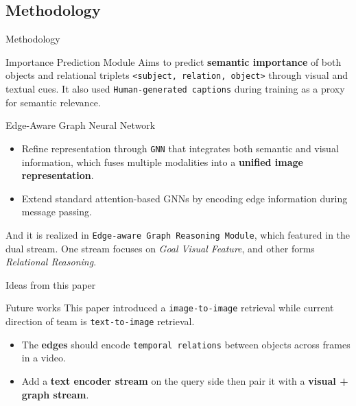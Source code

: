 \subsection{Methodology}
\begin{frame}{Methodology}
    \begin{block}{Importance Prediction Module}
        Aims to predict \textbf{semantic importance} of both objects and relational triplets \texttt{<subject, relation, object>} through 
        visual and textual cues. It also used \texttt{Human-generated captions} during training as a proxy for semantic relevance.
    \end{block}

    \begin{block}{Edge-Aware Graph Neural Network}
        \begin{itemize}
            \item Refine representation through \texttt{GNN} that integrates both semantic and visual information, 
            which fuses multiple modalities into a \textbf{unified image representation}.
            \item Extend standard attention-based GNNs by encoding edge information during message passing.
        \end{itemize}

        And it is realized in \texttt{Edge-aware Graph Reasoning Module}, which featured in the dual stream. One stream focuses on \textit{Goal Visual Feature}, 
        and other forms \textit{Relational Reasoning}. 
    \end{block}
\end{frame} 

\begin{frame}{Ideas from this paper}
    \begin{block}{Future works}
        This paper introduced a \texttt{image-to-image} retrieval while current direction of team is \texttt{text-to-image} retrieval.

        \begin{itemize}
            \item The \textbf{edges} should encode \texttt{temporal relations} between objects across frames in a video.
            \item Add a \textbf{text encoder stream} on the query side then pair it with a \textbf{visual + graph stream}.
        \end{itemize}
    \end{block}
\end{frame}